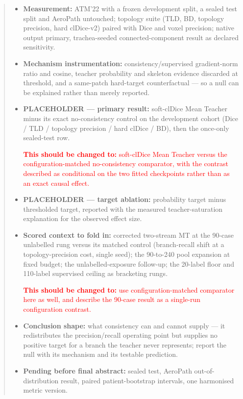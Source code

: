 \documentclass[
11pt, %
oneside, %
english, %
singlespacing, %
parskip, %
headsepline, %
]{MastersDoctoralThesis} %
\begin{document}
\begin{abstract}
\begin{itemize}
  \item \textbf{Measurement:} ATM'22 with a frozen development split, a sealed test split and
  AeroPath untouched; topology suite (TLD, BD, topology precision, hard clDice-v2) paired
  with Dice and voxel precision; native output primary, trachea-seeded connected-component
  result as declared sensitivity.
  \item \textbf{Mechanism instrumentation:} consistency/supervised gradient-norm ratio and
  cosine, teacher probability and skeleton evidence discarded at threshold, and a same-patch
  hard-target counterfactual --- so a null can be explained rather than merely reported.
  \item \textbf{PLACEHOLDER --- primary result:} soft-clDice Mean Teacher minus its exact
  no-consistency control on the development cohort (Dice / TLD / topology precision / hard
  clDice / BD), then the once-only sealed-test row.
  \par\textcolor{red}{\textbf{This should be changed to:} soft-clDice Mean Teacher versus the
  configuration-matched no-consistency comparator, with the contrast described as conditional
  on the two fitted checkpoints rather than as an exact causal effect.}
  \item \textbf{PLACEHOLDER --- target ablation:} probability target minus thresholded
  target, reported with the measured teacher-saturation explanation for the observed effect
  size.
  \item \textbf{Scored context to fold in:} corrected two-stream MT at the 90-case unlabelled
  rung versus its matched control (branch-recall shift at a topology-precision cost, single
  seed); the 90-to-240 pool expansion at fixed budget; the unlabelled-exposure follow-up; the
  20-label floor and 110-label supervised ceiling as bracketing rungs.
  \par\textcolor{red}{\textbf{This should be changed to:} use configuration-matched comparator
  here as well, and describe the 90-case result as a single-run configuration contrast.}
  \item \textbf{Conclusion shape:} what consistency can and cannot supply --- it redistributes
  the precision/recall operating point but supplies no positive target for a branch the
  teacher never represents; report the null with its mechanism and its testable prediction.
  \item \textbf{Pending before final abstract:} sealed test, AeroPath out-of-distribution
  result, paired patient-bootstrap intervals, one harmonised metric version.
\end{itemize}
\end{abstract}
\end{document}
